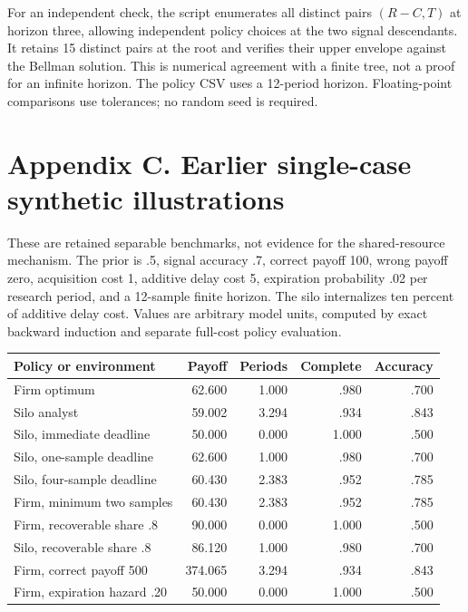 \documentclass[
  11pt,
]{article}
\begin{document}
For an independent check, the script enumerates all distinct pairs
\((R-C,T)\) at horizon three, allowing independent policy choices at the
two signal descendants. It retains 15 distinct pairs at the root and
verifies their upper envelope against the Bellman solution. This is
numerical agreement with a finite tree, not a proof for an infinite
horizon. The policy CSV uses a 12-period horizon. Floating-point
comparisons use tolerances; no random seed is required.

\section{Appendix C. Earlier single-case synthetic
illustrations}\label{appendix-c.-earlier-single-case-synthetic-illustrations}

These are retained separable benchmarks, not evidence for the
shared-resource mechanism. The prior is .5, signal accuracy .7, correct
payoff 100, wrong payoff zero, acquisition cost 1, additive delay cost
5, expiration probability .02 per research period, and a 12-sample
finite horizon. The silo internalizes ten percent of additive delay
cost. Values are arbitrary model units, computed by exact backward
induction and separate full-cost policy evaluation.

\begin{center}
\small
\begin{tabular}{@{}p{2.55in}rrrr@{}}
\toprule
Policy or environment & Payoff & Periods & Complete & Accuracy \\
\midrule
Firm optimum & 62.600 & 1.000 & .980 & .700 \\
Silo analyst & 59.002 & 3.294 & .934 & .843 \\
Silo, immediate deadline & 50.000 & 0.000 & 1.000 & .500 \\
Silo, one-sample deadline & 62.600 & 1.000 & .980 & .700 \\
Silo, four-sample deadline & 60.430 & 2.383 & .952 & .785 \\
Firm, minimum two samples & 60.430 & 2.383 & .952 & .785 \\
Firm, recoverable share .8 & 90.000 & 0.000 & 1.000 & .500 \\
Silo, recoverable share .8 & 86.120 & 1.000 & .980 & .700 \\
Firm, correct payoff 500 & 374.065 & 3.294 & .934 & .843 \\
Firm, expiration hazard .20 & 50.000 & 0.000 & 1.000 & .500 \\
\bottomrule
\end{tabular}
\end{center}
\end{document}
